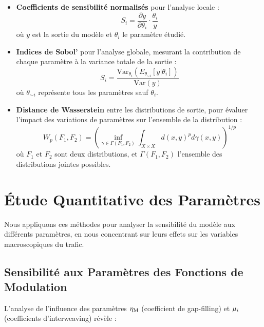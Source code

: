 \begin{itemize}
\item \textbf{Coefficients de sensibilité normalisés} pour l'analyse locale :
\begin{equation}
S_i = \frac{\partial y}{\partial \theta_i} \cdot \frac{\theta_i}{y}
\end{equation}
où $y$ est la sortie du modèle et $\theta_i$ le paramètre étudié.

\item \textbf{Indices de Sobol'} pour l'analyse globale, mesurant la contribution de chaque paramètre à la variance totale de la sortie :
\begin{equation}
S_i = \frac{\text{Var}_{\theta_i}(E_{\theta_{\sim i}}[y|\theta_i])}{\text{Var}(y)}
\end{equation}
où $\theta_{\sim i}$ représente tous les paramètres sauf $\theta_i$.

\item \textbf{Distance de Wasserstein} entre les distributions de sortie, pour évaluer l'impact des variations de paramètres sur l'ensemble de la distribution :
\begin{equation}
W_p(F_1, F_2) = \left( \inf_{\gamma \in \Gamma(F_1, F_2)} \int_{X \times X} d(x, y)^p d\gamma(x, y) \right)^{1/p}
\end{equation}
où $F_1$ et $F_2$ sont deux distributions, et $\Gamma(F_1, F_2)$ l'ensemble des distributions jointes possibles.
\end{itemize}

\section{Étude Quantitative des Paramètres}
\label{sec:etude_quantitative}

Nous appliquons ces méthodes pour analyser la sensibilité du modèle aux différents paramètres, en nous concentrant sur leurs effets sur les variables macroscopiques du trafic.

\subsection{Sensibilité aux Paramètres des Fonctions de Modulation}
\label{subsec:sensibilite_modulation}

L'analyse de l'influence des paramètres $\eta_{\text{M}}$ (coefficient de gap-filling) et $\mu_{i}$ (coefficients d'interweaving) révèle :

